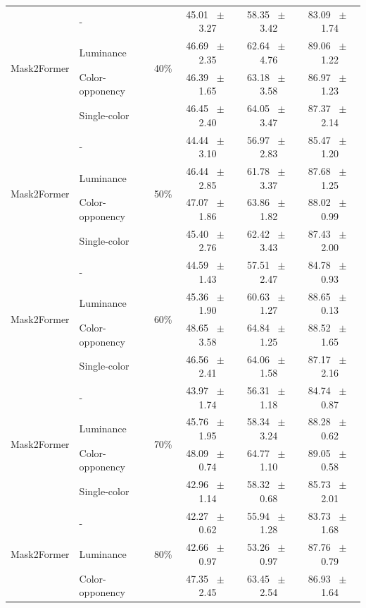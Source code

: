 \begin{table}[h]
\begin{tabular}{@{}l l c c c c@{}}
    \multirow{4}{*}{Mask2Former} & - & \multirow{4}{*}{40\%} & 45.01 ~$\pm$~ 3.27 & 58.35 ~$\pm$~ 3.42 & 83.09 ~$\pm$~ 1.74 \\
    & Luminance &  & 46.69 ~$\pm$~ 2.35 & 62.64 ~$\pm$~ 4.76 & 89.06 ~$\pm$~ 1.22 \\
    & Color-opponency &  & 46.39 ~$\pm$~ 1.65 & 63.18 ~$\pm$~ 3.58 & 86.97 ~$\pm$~ 1.23 \\
    & Single-color &  & 46.45 ~$\pm$~ 2.40 & 64.05 ~$\pm$~ 3.47 & 87.37 ~$\pm$~ 2.14 \\
    \midrule
    \multirow{4}{*}{Mask2Former} & - & \multirow{4}{*}{50\%} & 44.44 ~$\pm$~ 3.10 & 56.97 ~$\pm$~ 2.83 & 85.47 ~$\pm$~ 1.20 \\
    & Luminance &  & 46.44 ~$\pm$~ 2.85 & 61.78 ~$\pm$~ 3.37 & 87.68 ~$\pm$~ 1.25 \\
    & Color-opponency &  & 47.07 ~$\pm$~ 1.86 & 63.86 ~$\pm$~ 1.82 & 88.02 ~$\pm$~ 0.99 \\
    & Single-color &  & 45.40 ~$\pm$~ 2.76 & 62.42 ~$\pm$~ 3.43 & 87.43 ~$\pm$~ 2.00 \\
    \midrule
    \multirow{4}{*}{Mask2Former} & - & \multirow{4}{*}{60\%} & 44.59 ~$\pm$~ 1.43 & 57.51 ~$\pm$~ 2.47 & 84.78 ~$\pm$~ 0.93 \\
    & Luminance &  & 45.36 ~$\pm$~ 1.90 & 60.63 ~$\pm$~ 1.27 & 88.65 ~$\pm$~ 0.13 \\
    & Color-opponency &  & 48.65 ~$\pm$~ 3.58 & 64.84 ~$\pm$~ 1.25 & 88.52 ~$\pm$~ 1.65 \\
    & Single-color &  & 46.56 ~$\pm$~ 2.41 & 64.06 ~$\pm$~ 1.58 & 87.17 ~$\pm$~ 2.16 \\
    \midrule
    \multirow{4}{*}{Mask2Former} & - & \multirow{4}{*}{70\%} & 43.97 ~$\pm$~ 1.74 & 56.31 ~$\pm$~ 1.18 & 84.74 ~$\pm$~ 0.87 \\
    & Luminance &  & 45.76 ~$\pm$~ 1.95 & 58.34 ~$\pm$~ 3.24 & 88.28 ~$\pm$~ 0.62 \\
    & Color-opponency &  & 48.09 ~$\pm$~ 0.74 & 64.77 ~$\pm$~ 1.10 & 89.05 ~$\pm$~ 0.58 \\
    & Single-color &  & 42.96 ~$\pm$~ 1.14 & 58.32 ~$\pm$~ 0.68 & 85.73 ~$\pm$~ 2.01 \\
    \midrule
    \multirow{4}{*}{Mask2Former} & - & \multirow{4}{*}{80\%} & 42.27 ~$\pm$~ 0.62 & 55.94 ~$\pm$~ 1.28 & 83.73 ~$\pm$~ 1.68 \\
    & Luminance &  & 42.66 ~$\pm$~ 0.97 & 53.26 ~$\pm$~ 0.97 & 87.76 ~$\pm$~ 0.79 \\
    & Color-opponency &  & 47.35 ~$\pm$~ 2.45 & 63.45 ~$\pm$~ 2.54 & 86.93 ~$\pm$~ 1.64 \\

\end{tabular}
\end{table}

